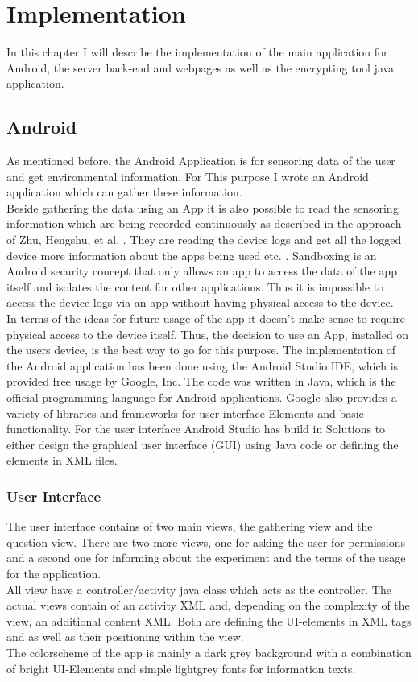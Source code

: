\chapter{Implementation}

In this chapter I will describe the implementation of the main application for Android, the server back-end and webpages as well as the encrypting tool java application. 

\section{Android}
As mentioned before, the Android Application is for sensoring data of the user and get environmental information. For This purpose I wrote an Android application which can gather these information.\\ 
Beside gathering the data using an App it is also possible to read the sensoring information which are being recorded continuously as described in the approach of
Zhu, Hengshu, et al. \cite{zhu2015mining}. They are reading the device logs and get all the logged device more information about the apps being used etc. .
Sandboxing is an Android security concept that only allows an app to access the data of the app itself and isolates the content for other applications. Thus it is impossible to access the device logs via an app without having physical access to the device.\\
In terms of the ideas for future usage of the app it doesn't make sense to require physical access to the device itself. Thus, the decision to use an App, installed on the users device, is the best way to go for this purpose.
\bigbreak
The implementation of the Android application has been done using the Android Studio IDE, which is provided free usage by Google, Inc. The code was written in Java, which is the official programming language for Android applications. Google also provides a variety of libraries and frameworks for user interface-Elements and basic functionality. For the user interface Android Studio has build in Solutions to either design the graphical user interface (GUI) using Java code or defining the elements in XML files. 

\subsection{User Interface}
The user interface contains of two main views, the gathering view and the question view. There are two more views, one for asking the user for permissions and a second one for informing about the experiment and the terms of the usage for the application.\\
All view have a controller/activity java class which acts as the controller. The actual views contain of an activity XML and, depending on the complexity of the view, an additional content XML. Both are defining the UI-elements in XML tags and as well as their positioning within the view.\\
The colorscheme of the app is mainly a dark grey background with a combination of bright UI-Elements and simple lightgrey fonts for information texts.

